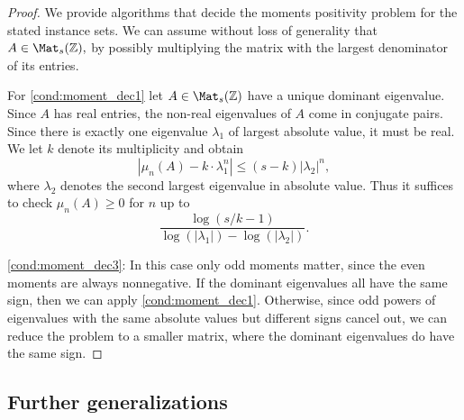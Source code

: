 \begin{proof} We provide algorithms that decide the moments positivity problem for the stated instance sets. We can assume without loss of generality that $A \in \Mat_s(\mathbb{Z}),$ by possibly multiplying the matrix with the largest denominator of its entries.

For \ref{cond:moment_dec1} let $A \in \Mat_s(\mathbb Z)$ have a unique dominant eigenvalue. Since $A$ has real entries, the non-real eigenvalues of $A$ come in conjugate pairs. Since there is exactly one eigenvalue $\lambda_1$ of largest absolute value, it must be real. We  let $k$ denote its multiplicity and obtain $$|\mu_n(A) -  k\cdot \lambda_1^n| \leqslant (s-k) |\lambda_2|^n,$$
where $\lambda_2$ denotes the second largest eigenvalue in absolute value. 
Thus it suffices to check $\mu_n(A) \geqslant 0$ for $n$ up to 
$$\frac{\log(s/k-1)}{ \log(|\lambda_1|)-\log(|\lambda_2|)}.$$

\ref{cond:moment_dec3}: In this case only odd moments matter, since the even moments are always nonnegative. If the dominant eigenvalues all have the same sign, then we can apply \ref{cond:moment_dec1}. Otherwise,  since odd powers of eigenvalues with the same absolute values but different signs cancel out, we can reduce the problem to a smaller matrix, where the dominant eigenvalues do have the same sign.
\end{proof}


\subsection{Further generalizations}

